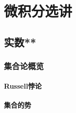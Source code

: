\part{微积分选讲}
\chapter{实数**}
\section{集合论概览}
\subsection{Russell悖论}
\clearpage
\subsection{集合的势}
\clearpage

